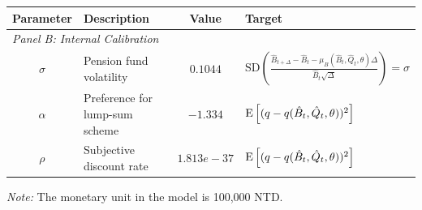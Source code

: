 \begin{threeparttable}
    \begin{tabularx}{\linewidth}{@{}c>{\raggedright\arraybackslash}Xc>{\raggedright\arraybackslash}X@{}}
        \toprule
        Parameter & Description & Value & Target \\
        \midrule
        \multicolumn{4}{l}{\textit{Panel B: Internal Calibration}} \\
        \addlinespace
        $\sigma$ & Pension fund volatility & $0.1044$ & $\text{SD}(\frac{\hat{B}_{t+\Delta}-\hat{B}_t-\mu_B(\hat{B}_t,\hat{Q}_t,\theta)\Delta}{\hat{B}_t\sqrt{\Delta}})=\sigma$ \\
        $\alpha$ & Preference for lump-sum scheme & $-1.334$ & $\operatorname{E}\left[ {(q - q(\hat{B}_t, \hat{Q}_t, \theta))^2} \right]$ \\
        $\rho$ & Subjective discount rate & $1.813e-37$ & $\operatorname{E}\left[ {(q - q(\hat{B}_t, \hat{Q}_t, \theta))^2} \right]$ \\
        \bottomrule
    \end{tabularx}

    \begin{tablenotes}[flushleft]
        \footnotesize
        \item \textit{Note:} The monetary unit in the model is 100,000 NTD.
    \end{tablenotes}
\end{threeparttable}

